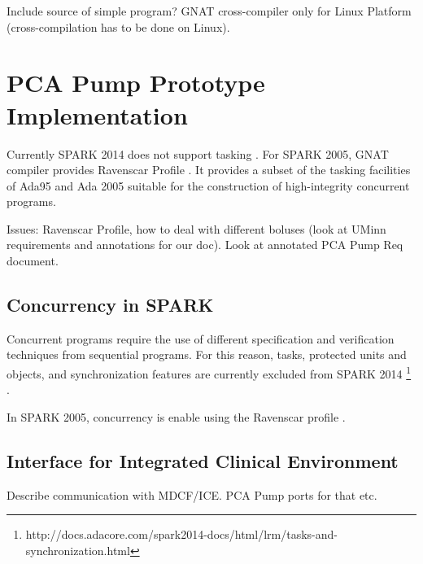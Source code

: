 Include source of simple program?
GNAT cross-compiler only for Linux Platform (cross-compilation has to be done on Linux).


\section{PCA Pump Prototype Implementation}
\label{pcapump:implementation}

Currently SPARK 2014 does not support tasking \cite{Spark2014refManual:Online}. For SPARK 2005, GNAT compiler provides Ravenscar Profile \cite{Ravenscar:Online}. It provides a subset of the tasking facilities of Ada95 and Ada 2005 suitable for the construction of high-integrity concurrent programs.

Issues: Ravenscar Profile, how to deal with different boluses (look at UMinn requirements and annotations for our doc).
Look at annotated PCA Pump Req document.

\subsection{Concurrency in SPARK}
\label{pcapump:implementation:concurrency}

Concurrent programs require the use of different specification and verification techniques from sequential programs. For this reason, tasks, protected units and objects, and synchronization features are currently excluded from SPARK 2014 \footnote{http://docs.adacore.com/spark2014-docs/html/lrm/tasks-and-synchronization.html} \cite{Spark2014refManual:Online}.

In SPARK 2005, concurrency is enable using the Ravenscar profile \cite{Ravenscar:Online}.

\subsection{Interface for Integrated Clinical Environment}
\label{pcapump:implementation:ice}

Describe communication with MDCF/ICE. PCA Pump ports for that etc.